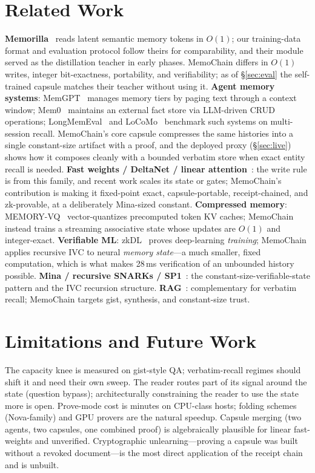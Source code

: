 \documentclass[11pt]{article}
\newcommand{\method}{MemoChain}
\begin{document}
\section{Related Work}
\textbf{Memorilla}~\cite{memorilla2026} reads latent semantic memory
tokens in $O(1)$; our training-data format and evaluation protocol
follow theirs for comparability, and their module served as the
distillation teacher in early phases. \method{} differs in $O(1)$
writes, integer bit-exactness, portability, and verifiability; as of
\S\ref{sec:eval} the self-trained capsule matches their teacher without
using it. \textbf{Agent memory systems}: MemGPT~\cite{packer2023memgpt}
manages memory tiers by paging text through a context window;
Mem0~\cite{chhikara2025mem0} maintains an external fact store via
LLM-driven CRUD operations; LongMemEval~\cite{wu2024longmemeval} and
LoCoMo~\cite{maharana2024locomo} benchmark such systems on multi-session
recall. \method{}'s core capsule compresses the same histories into a single
constant-size artifact with a proof, and the deployed proxy
(\S\ref{sec:live}) shows how it composes cleanly with a bounded
verbatim store when exact entity recall is needed. \textbf{Fast weights / DeltaNet / linear
attention}~\cite{schlag2021fast,yang2024delta,hatamizadeh2026gdn2,cabannes2026sdm}:
the write rule is from this family, and recent work scales its state or
gates; \method{}'s contribution is making it fixed-point exact,
capsule-portable, receipt-chained, and zk-provable, at a deliberately
Mina-sized constant. \textbf{Compressed memory}:
MEMORY-VQ~\cite{zemlyanskiy2023memoryvq} vector-quantizes precomputed
token KV caches; \method{} instead trains a streaming associative state
whose updates are $O(1)$ and integer-exact. \textbf{Verifiable ML}:
zkDL~\cite{sun2023zkdl} proves deep-learning \emph{training}; \method{}
applies recursive IVC to neural \emph{memory state}---a much smaller,
fixed computation, which is what makes 28\,ms verification of an
unbounded history possible. \textbf{Mina / recursive SNARKs /
SP1}~\cite{mina2020,sp1}: the constant-size-verifiable-state pattern and
the IVC recursion structure. \textbf{RAG}~\cite{lewis2020rag}: complementary for
verbatim recall; \method{} targets gist, synthesis, and
constant-size trust.

\section{Limitations and Future Work}
The capacity knee is measured on gist-style QA; verbatim-recall regimes
should shift it and need their own sweep. The reader routes part of
its signal around the state (question bypass); architecturally
constraining the reader to use the state more is open. Prove-mode cost
is minutes on CPU-class hosts; folding schemes (Nova-family) and GPU
provers are the natural speedup. Capsule merging (two agents, two
capsules, one combined proof) is algebraically plausible for linear
fast-weights and unverified. Cryptographic unlearning---proving a
capsule was built without a revoked document---is the most direct
application of the receipt chain and is unbuilt.
\end{document}
